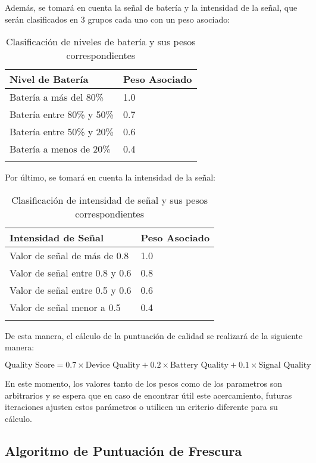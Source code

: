 Además, se tomará en cuenta la señal de batería y la intensidad de la señal, que serán clasificados en 3 grupos cada uno con un peso asociado:

\begin{longtable}{|p{6cm}|p{3cm}|}
    \hline
    \textbf{Nivel de Batería} & \textbf{Peso Asociado} \\
    \hline
    \endhead
    Batería a más del 80\% & 1.0 \\
    \hline
    Batería entre 80\% y 50\% & 0.7 \\
    \hline
    Batería entre 50\% y 20\% & 0.6 \\
    \hline
    Batería a menos de 20\% & 0.4 \\
    \hline
    \caption{Clasificación de niveles de batería y sus pesos correspondientes}
    \label{tab:bateria}
\end{longtable}

Por último, se tomará en cuenta la intensidad de la señal:
\begin{longtable}{|p{6cm}|p{3cm}|}
    \hline
    \textbf{Intensidad de Señal} & \textbf{Peso Asociado} \\
    \hline
    \endhead
    Valor de señal de más de 0.8 & 1.0 \\
    \hline
    Valor de señal entre 0.8 y 0.6 & 0.8 \\
    \hline
    Valor de señal entre 0.5 y 0.6 & 0.6 \\
    \hline
    Valor de señal menor a 0.5 & 0.4 \\
    \hline
    \caption{Clasificación de intensidad de señal y sus pesos correspondientes}
    \label{tab:senal}
\end{longtable}

\newpage
De esta manera, el cálculo de la puntuación de calidad se realizará de la siguiente manera:


\begin{equation}
    \text{Quality Score} = 0.7 \times \text{Device Quality} + 0.2 \times \text{Battery Quality} + 0.1 \times \text{Signal Quality}
\end{equation}


En este momento, los valores tanto de los pesos como de los parametros son arbitrarios y se espera que en caso de encontrar útil este acercamiento, 
futuras iteraciones ajusten estos parámetros o utilicen un criterio diferente para su cálculo.

\newpage

\subsection{Algoritmo de Puntuación de Frescura}


